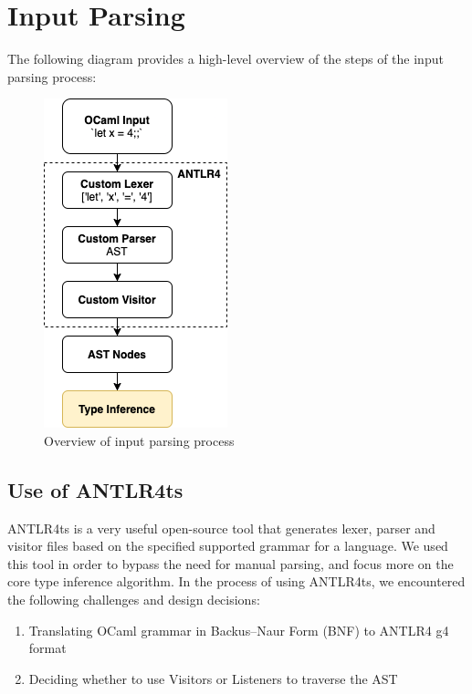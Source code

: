 \section{Input Parsing}

The following diagram provides a high-level overview of the steps of the input parsing process:

\begin{figure}[htbp]
\centerline{\includegraphics[scale=.6]{images/parse-process-diagram.png}}
\caption{Overview of input parsing process}
\label{fig}
\end{figure}

\subsection{Use of ANTLR4ts}
ANTLR4ts is a very useful open-source tool that generates lexer, parser and visitor files based on the specified supported grammar for a language. We used this tool in order to bypass the need for manual parsing, and focus more on the core type inference algorithm. In the process of using ANTLR4ts, we encountered the following challenges and design decisions:
\begin{enumerate}
    \item Translating OCaml grammar in Backus–Naur Form (BNF) to ANTLR4 g4 format
    \item Deciding whether to use Visitors or Listeners to traverse the AST
\end{enumerate}
  
